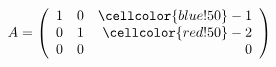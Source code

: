 \documentclass[border=1pt]{standalone}
\begin{document}
\thispagestyle{empty}
$
A=\left(\begin{array}{rrr}
1 & 0 & \cellcolor{blue!50}-1 \\ 0 & 1 & \cellcolor{red!50}-2 \\
0 & 0 & 0
\end{array}\right)
$
\end{document}

